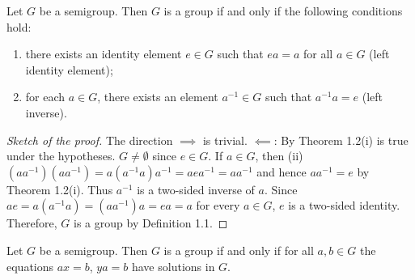 \begin{proposition}[1.3]
Let $G$ be a semigroup. Then $G$ is a group if and only if the following
conditions hold:
\begin{enumerate}[label=\textnormal{(\roman*)}]
\item there exists an identity element $e\in G$ such that $ea=a$ for all
  $a\in G$ (left identity element);
\item for each $a\in G$, there exists an element $a^{-1}\in G$ such that
  $a^{-1}a=e$ (left inverse).
\end{enumerate}
\end{proposition}
\begin{proof}[Sketch of the proof]
The direction $\implies$ is trivial. $\impliedby$: By Theorem 1.2(i) is
true under the hypotheses. $G\neq\emptyset$ since $e\in G$. If $a\in G$,
then (ii) $(aa^{-1})(aa^{-1})=a(a^{-1}a)a^{-1}=aea^{-1}=aa^{-1}$ and hence
$aa^{-1}=e$ by Theorem 1.2(i). Thus $a^{-1}$ is a two-sided inverse of
$a$. Since $ae=a(a^{-1}a)=(aa^{-1})a=ea=a$ for every $a\in G$, $e$ is a
two-sided identity. Therefore, $G$ is a group by Definition 1.1.
\end{proof}
\begin{proposition}[1.4]
Let $G$ be a semigroup. Then $G$ is a group if and only if for all $a,b\in
G$ the equations $ax=b$, $ya=b$ have solutions in $G$.
\end{proposition}
